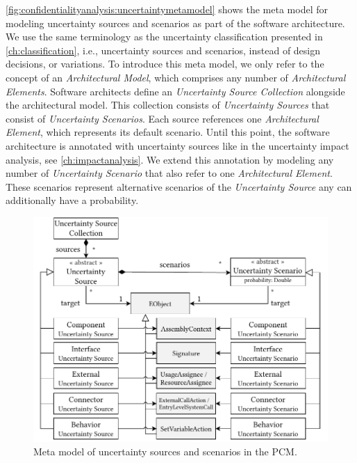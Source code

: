 \autoref{fig:confidentialityanalysis:uncertaintymetamodel} shows the meta model for modeling uncertainty sources and scenarios as part of the software architecture.
We use the same terminology as the uncertainty classification presented in \autoref{ch:classification}, i.e., uncertainty sources and scenarios, instead of design decisions, or variations.
To introduce this meta model, we only refer to the concept of an \emph{Architectural Model}, which comprises any number of \emph{Architectural Elements}.
Software architects define an \emph{Uncertainty Source Collection} alongside the architectural model.
This collection consists of \emph{Uncertainty Sources} that consist of \emph{Uncertainty Scenarios}.
Each source references one \emph{Architectural Element}, which represents its default scenario.
Until this point, the software architecture is annotated with uncertainty sources like in the uncertainty impact analysis, see \autoref{ch:impactanalysis}.
We extend this annotation by modeling any number of \emph{Uncertainty Scenario} that also refer to one \emph{Architectural Element}.
These scenarios represent alternative scenarios of the \emph{Uncertainty Source} any can additionally have a probability.

\begin{figure}
    \centering
    \includegraphics[width=\linewidth]{figures/chapter7/abunai-metamodel-pcm.pdf}
    \caption{Meta model of uncertainty sources and scenarios in the \acf*{PCM}.}
    \label{fig:confidentialityanalysis:uncertaintymetamodelpcm}
\end{figure}

